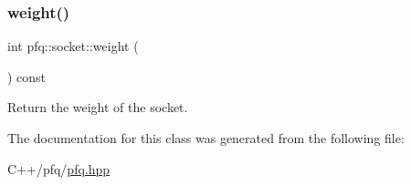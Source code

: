 \mbox{\label{classpfq_1_1socket_a8c596af298aaae176a64647ba04f51ff}} 
\subsubsection{\texorpdfstring{weight()}{weight()}\hspace{0.1cm}{\footnotesize\ttfamily [2/2]}}
{\footnotesize\ttfamily int pfq\+::socket\+::weight (\begin{DoxyParamCaption}{ }\end{DoxyParamCaption}) const\hspace{0.3cm}{\ttfamily [inline]}}



Return the weight of the socket. 



The documentation for this class was generated from the following file\+:\begin{DoxyCompactItemize}
\item 
C++/pfq/\hyperlink{pfq_8hpp}{pfq.\+hpp}\end{DoxyCompactItemize}
